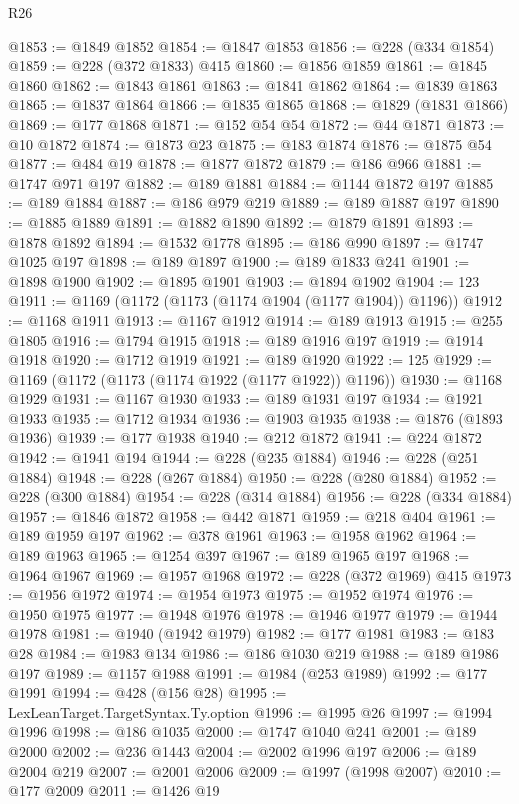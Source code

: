 \begin{lexlean}{R26}
\begin{coremodule}
@1853 := @1849 @1852
@1854 := @1847 @1853
@1856 := @228 (@334 @1854)
@1859 := @228 (@372 @1833) @415
@1860 := @1856 @1859
@1861 := @1845 @1860
@1862 := @1843 @1861
@1863 := @1841 @1862
@1864 := @1839 @1863
@1865 := @1837 @1864
@1866 := @1835 @1865
@1868 := @1829 (@1831 @1866)
@1869 := @177 @1868
@1871 := @152 @54 @54
@1872 := @44 @1871
@1873 := @10 @1872
@1874 := @1873 @23
@1875 := @183 @1874
@1876 := @1875 @54
@1877 := @484 @19
@1878 := @1877 @1872
@1879 := @186 @966
@1881 := @1747 @971 @197
@1882 := @189 @1881
@1884 := @1144 @1872 @197
@1885 := @189 @1884
@1887 := @186 @979 @219
@1889 := @189 @1887 @197
@1890 := @1885 @1889
@1891 := @1882 @1890
@1892 := @1879 @1891
@1893 := @1878 @1892
@1894 := @1532 @1778
@1895 := @186 @990
@1897 := @1747 @1025 @197
@1898 := @189 @1897
@1900 := @189 @1833 @241
@1901 := @1898 @1900
@1902 := @1895 @1901
@1903 := @1894 @1902
@1904 := 123
@1911 := @1169 (@1172 (@1173 (@1174 @1904 (@1177 @1904)) @1196))
@1912 := @1168 @1911
@1913 := @1167 @1912
@1914 := @189 @1913
@1915 := @255 @1805
@1916 := @1794 @1915
@1918 := @189 @1916 @197
@1919 := @1914 @1918
@1920 := @1712 @1919
@1921 := @189 @1920
@1922 := 125
@1929 := @1169 (@1172 (@1173 (@1174 @1922 (@1177 @1922)) @1196))
@1930 := @1168 @1929
@1931 := @1167 @1930
@1933 := @189 @1931 @197
@1934 := @1921 @1933
@1935 := @1712 @1934
@1936 := @1903 @1935
@1938 := @1876 (@1893 @1936)
@1939 := @177 @1938
@1940 := @212 @1872
@1941 := @224 @1872
@1942 := @1941 @194
@1944 := @228 (@235 @1884)
@1946 := @228 (@251 @1884)
@1948 := @228 (@267 @1884)
@1950 := @228 (@280 @1884)
@1952 := @228 (@300 @1884)
@1954 := @228 (@314 @1884)
@1956 := @228 (@334 @1884)
@1957 := @1846 @1872
@1958 := @442 @1871
@1959 := @218 @404
@1961 := @189 @1959 @197
@1962 := @378 @1961
@1963 := @1958 @1962
@1964 := @189 @1963
@1965 := @1254 @397
@1967 := @189 @1965 @197
@1968 := @1964 @1967
@1969 := @1957 @1968
@1972 := @228 (@372 @1969) @415
@1973 := @1956 @1972
@1974 := @1954 @1973
@1975 := @1952 @1974
@1976 := @1950 @1975
@1977 := @1948 @1976
@1978 := @1946 @1977
@1979 := @1944 @1978
@1981 := @1940 (@1942 @1979)
@1982 := @177 @1981
@1983 := @183 @28
@1984 := @1983 @134
@1986 := @186 @1030 @219
@1988 := @189 @1986 @197
@1989 := @1157 @1988
@1991 := @1984 (@253 @1989)
@1992 := @177 @1991
@1994 := @428 (@156 @28)
@1995 := LexLeanTarget.TargetSyntax.Ty.option
@1996 := @1995 @26
@1997 := @1994 @1996
@1998 := @186 @1035
@2000 := @1747 @1040 @241
@2001 := @189 @2000
@2002 := @236 @1443
@2004 := @2002 @1996 @197
@2006 := @189 @2004 @219
@2007 := @2001 @2006
@2009 := @1997 (@1998 @2007)
@2010 := @177 @2009
@2011 := @1426 @19

\end{coremodule}
\end{lexlean}
